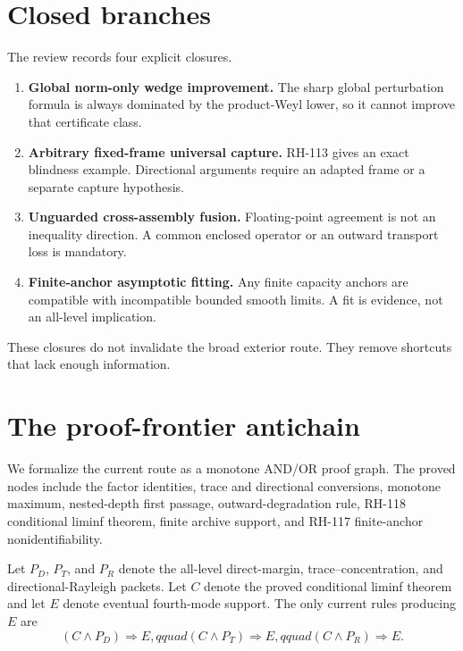 \documentclass[12pt]{article}
\begin{document}
\section{Closed branches}
The review records four explicit closures.

\begin{enumerate}
 \item \textbf{Global norm-only wedge improvement.}  The sharp global
 perturbation formula is always dominated by the product-Weyl lower, so it
 cannot improve that certificate class.
 \item \textbf{Arbitrary fixed-frame universal capture.}  RH-113 gives an
 exact blindness example.  Directional arguments require an adapted frame
 or a separate capture hypothesis.
 \item \textbf{Unguarded cross-assembly fusion.}  Floating-point agreement
 is not an inequality direction.  A common enclosed operator or an outward
 transport loss is mandatory.
 \item \textbf{Finite-anchor asymptotic fitting.}  Any finite capacity
 anchors are compatible with incompatible bounded smooth limits.  A fit is
 evidence, not an all-level implication.
\end{enumerate}

These closures do not invalidate the broad exterior route.  They remove
shortcuts that lack enough information.

\section{The proof-frontier antichain}
We formalize the current route as a monotone AND/OR proof graph.  The proved
nodes include the factor identities, trace and directional conversions,
monotone maximum, nested-depth first passage, outward-degradation rule,
RH-118 conditional liminf theorem, finite archive support, and RH-117
finite-anchor nonidentifiability.

Let $P_D$, $P_T$, and $P_R$ denote the all-level direct-margin,
trace--concentration, and directional-Rayleigh packets.  Let $C$ denote the
proved conditional liminf theorem and let $E$ denote eventual fourth-mode
support.  The only current rules producing $E$ are
\begin{equation}\label{eq:rules}
 (C\wedge P_D)\Rightarrow E,qquad
 (C\wedge P_T)\Rightarrow E,qquad
 (C\wedge P_R)\Rightarrow E.
\end{equation}
\end{document}
